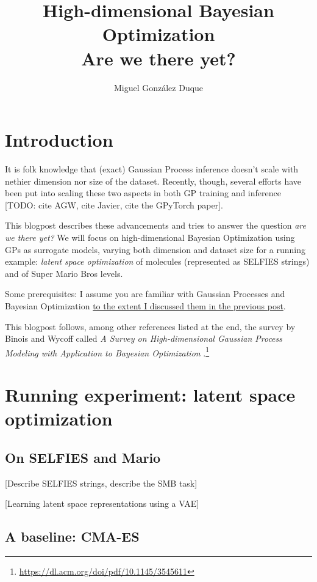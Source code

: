 \documentclass{article}
\title{High-dimensional Bayesian Optimization \\ Are we there yet?}
\author{Miguel González Duque}
\date{}
\begin{document}
\maketitle

\section*{Introduction}

It is folk knowledge that (exact) Gaussian Process inference doesn't scale with nethier dimension nor size of the dataset. Recently, though, several efforts have been put into scaling these two aspects in both GP training and inference [TODO: cite AGW, cite Javier, cite the GPyTorch paper].

This blogpost describes these advancements and tries to answer the question \textit{are we there yet?} We will focus on high-dimensional Bayesian Optimization using GPs as surrogate models, varying both dimension and dataset size for a running example: \textit{latent space optimization} of molecules (represented as SELFIES strings) and of Super Mario Bros levels.

Some prerequisites: I assume you are familiar with Gaussian Processes and Bayesian Optimization \href{https://www.miguelgondu.com/blogposts/2023-07-31/intro-to-bo/}{to the extent I discussed them in the previous post}.

This blogpost follows, among other references listed at the end, the survey by Binois and Wycoff called \textit{A Survey on High-dimensional Gaussian Process Modeling with Application to Bayesian Optimization} \cite{BinoisWycoff:high-dimensional-bo:2022}.\footnote{\url{https://dl.acm.org/doi/pdf/10.1145/3545611}}

\section*{Running experiment: latent space optimization}

\subsection*{On SELFIES and Mario}

[Describe SELFIES strings, describe the SMB task]

[Learning latent space representations using a VAE]

\subsection*{A baseline: CMA-ES}
\end{document}

